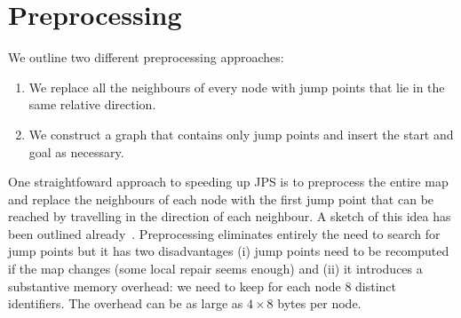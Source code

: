 \section{Preprocessing}
\label{sec::preprocessing}
We outline two different preprocessing approaches:

\begin{enumerate}
\item{We replace all the neighbours of every node
with jump points that lie in the same relative direction}.
\item{We construct a graph that contains only jump points
and insert the start and goal as necessary.}
\end{enumerate}

One straightfoward approach to speeding up JPS is to preprocess
the entire map and replace the neighbours of each node
with the first jump point that can be reached by travelling in the
direction of each neighbour. A sketch of this idea has been 
outlined already~\cite{harabor12}.
Preprocessing eliminates entirely the need to search for jump
points but it has two disadvantages (i) jump points need to be recomputed
if the map changes (some local repair seems enough) and (ii) it introduces 
a substantive memory overhead: we need to keep for each node 8 distinct identifiers. 
The overhead can be as large as $4\times8$ bytes per node.
